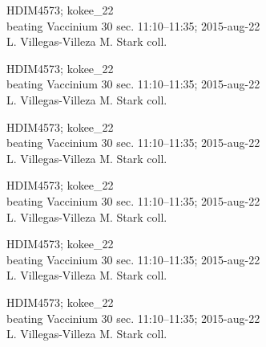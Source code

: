 \documentclass[2pt]{extarticle}
\begin{document}
\noindent
\parbox{0.16\textwidth}{\tiny \raggedright \rule[-0.3\baselineskip]{0pt}{10pt}HDIM4573; kokee\_22\\ beating Vaccinium 30 sec. 11:10--11:35; 2015-aug-22\\ L. Villegas-Villeza M. Stark coll.}
\parbox{0.16\textwidth}{\tiny \raggedright \rule[-0.3\baselineskip]{0pt}{10pt}HDIM4573; kokee\_22\\ beating Vaccinium 30 sec. 11:10--11:35; 2015-aug-22\\ L. Villegas-Villeza M. Stark coll.}
\parbox{0.16\textwidth}{\tiny \raggedright \rule[-0.3\baselineskip]{0pt}{10pt}HDIM4573; kokee\_22\\ beating Vaccinium 30 sec. 11:10--11:35; 2015-aug-22\\ L. Villegas-Villeza M. Stark coll.}
\parbox{0.16\textwidth}{\tiny \raggedright \rule[-0.3\baselineskip]{0pt}{10pt}HDIM4573; kokee\_22\\ beating Vaccinium 30 sec. 11:10--11:35; 2015-aug-22\\ L. Villegas-Villeza M. Stark coll.}
\parbox{0.16\textwidth}{\tiny \raggedright \rule[-0.3\baselineskip]{0pt}{10pt}HDIM4573; kokee\_22\\ beating Vaccinium 30 sec. 11:10--11:35; 2015-aug-22\\ L. Villegas-Villeza M. Stark coll.}
\parbox{0.16\textwidth}{\tiny \raggedright \rule[-0.3\baselineskip]{0pt}{10pt}HDIM4573; kokee\_22\\ beating Vaccinium 30 sec. 11:10--11:35; 2015-aug-22\\ L. Villegas-Villeza M. Stark coll.} \\ 
\vspace{0.001in} 
\end{document}
